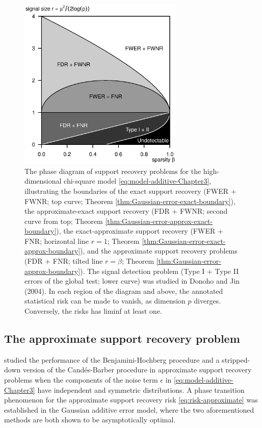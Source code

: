 \begin{figure}
  \begin{center}
    \includegraphics[width=0.7\textwidth]{./figures/phase_diagram_Gaussian_ALL_boundaries.eps}
  \end{center}
   \caption{The phase diagram of support recovery problems for the high-dimensional chi-square model \eqref{eq:model-additive-Chapter3}, illustrating the boundaries of the exact support recovery (FWER + FWNR; top curve; Theorem \ref{thm:Gaussian-error-exact-boundary}), the approximate-exact support recovery (FDR + FWNR; second curve from top; Theorem \ref{thm:Gaussian-error-approx-exact-boundary}), the exact-approximate support recovery (FWER + FNR; horizontal line $r=1$; Theorem \ref{thm:Gaussian-error-exact-approx-boundary}), and the approximate support recovery problems (FDR + FNR; tilted line $r=\beta$; Theorem \ref{thm:Gaussian-error-approx-boundary}). The signal detection problem (Type I + Type II errors of the global test; lower curve) was studied in Donoho and Jin (2004). In each region of the diagram and above, the annotated statistical risk can be made to vanish, as dimension $p$ diverges. Conversely, the risks has liminf at least one.}
   \label{fig:phase-Gaussian-errors}
\end{figure}


\subsection{The approximate support recovery problem}
\label{subsec:approx-support-recovery-Gaussian}

\cite{arias2017distribution} studied the performance of the Benjamini-Hochberg procedure \citep{benjamini1995controlling} and a stripped-down version of the Cand\'es-Barber procedure \citep{barber2015controlling} in approximate support recovery problems when the components of the noise term $\epsilon$ in \eqref{eq:model-additive-Chapter3} have independent and symmetric distributions.
A phase transition phenomenon for the approximate support recovery risk \eqref{eq:risk-approximate} was established in the Gaussian additive error model, where the two aforementioned methods are both shown to be asymptotically optimal.

